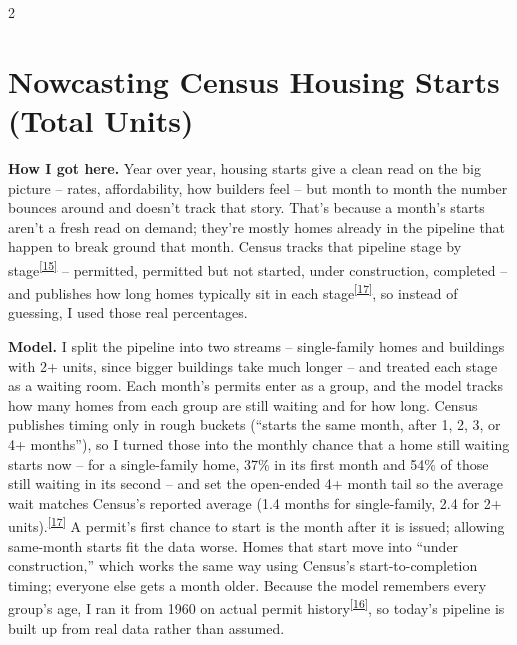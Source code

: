 \documentclass[10pt]{article}
\DeclareRobustCommand{\srcnum}[1]{\textsuperscript{\hyperlink{src#1}{[#1]}}}
\begin{document}
\begin{multicols}{2}
\section{Nowcasting Census Housing Starts (Total Units)}

\textbf{How I got here.} Year over year, housing starts give a clean read on the big picture -- rates, affordability, how builders feel -- but month to month the number bounces around and doesn't track that story. That's because a month's starts aren't a fresh read on demand; they're mostly homes already in the pipeline that happen to break ground that month. Census tracks that pipeline stage by stage\srcnum{15} -- permitted, permitted but not started, under construction, completed -- and publishes how long homes typically sit in each stage\srcnum{17}, so instead of guessing, I used those real percentages.

\textbf{Model.} I split the pipeline into two streams -- single-family homes and buildings with 2+ units, since bigger buildings take much longer -- and treated each stage as a waiting room. Each month's permits enter as a group, and the model tracks how many homes from each group are still waiting and for how long. Census publishes timing only in rough buckets (``starts the same month, after 1, 2, 3, or 4+ months''), so I turned those into the monthly chance that a home still waiting starts now -- for a single-family home, 37\% in its first month and 54\% of those still waiting in its second -- and set the open-ended 4+ month tail so the average wait matches Census's reported average (1.4 months for single-family, 2.4 for 2+ units).\srcnum{17} A permit's first chance to start is the month after it is issued; allowing same-month starts fit the data worse. Homes that start move into ``under construction,'' which works the same way using Census's start-to-completion timing; everyone else gets a month older. Because the model remembers every group's age, I ran it from 1960 on actual permit history\srcnum{16}, so today's pipeline is built up from real data rather than assumed.


\end{multicols}
\end{document}
